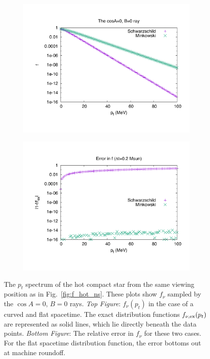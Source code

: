 \begin{figure}
  \centering
  \begin{subfigure}{.7\textwidth}
    \centering
    \includegraphics[width=1\linewidth]{Figures/fnue_vs_E-asano_fukuyama}
  \end{subfigure}
  \begin{subfigure}{.7\textwidth}
    \centering
    \includegraphics[width=1\linewidth]{Figures/fnueError_vs_E-asano_fukuyama}
  \end{subfigure}
  \caption[$f_\nu$ for a hot compact star: asymptotic energy spectrum]{
    The $p_t$ spectrum of the hot compact star from the same viewing
    position as in Fig.~\ref{fig:f_hot_ns}. These plots show $f_\nu$ sampled by
    the $\cos A=0$, $B=0$ rays.
    \emph{Top Figure}: $f_\nu(p_t)$ in the case of a curved and flat spacetime.
    The exact distribution functions $f_{\nu, \rm ex}(p_t)$ are represented as solid
    lines, which lie directly beneath the data points.
    \emph{Bottom Figure}: The relative error in $f_\nu$ for these two cases.
    For the flat spacetime distribution function, the error bottoms out at
    machine roundoff.
  }
  \label{fig:f_spectrum_hot_ns}
\end{figure}

